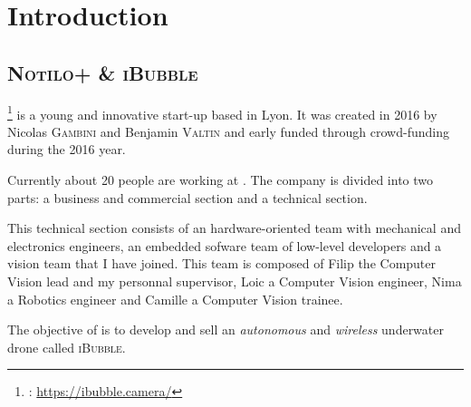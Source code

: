 
\chapter{Introduction} %

\label{Introduction} %


\newcommand{\keyword}[1]{\textbf{#1}}
\newcommand{\tabhead}[1]{\textbf{#1}}
\newcommand{\code}[1]{\texttt{\hl{#1}}}
\newcommand{\file}[1]{\texttt{\bfseries#1}}
\newcommand{\option}[1]{\texttt{\itshape#1}}
\newcommand{\iBubble}{\textcolor{mdtRed}{\textsc{iBubble}}}
\newcommand{\rasp}{\textcolor{mdtRed}{\textsc{Raspberry Pi}}}
\newcommand{\vc}{\textcolor{mdtRed}{\textsc{VideoCore IV 3D}}}
\newcommand{\cpu}{\textcolor{mdtRed}{\textsc{ARM CPU}}}
\newcommand{\bcm}{\textcolor{mdtRed}{\textsc{BCM2837}}}
\newcommand{\qpu}{\textcolor{mdtRed}{\textsc{QPU}}}


\section{\textsc{Notilo+} \& \textsc{iBubble}}

\footnote{\groupname{}: \url{https://ibubble.camera/}}\groupname{} is a young and innovative start-up based in Lyon. It was created in 2016 by Nicolas \textsc{Gambini} and Benjamin \textsc{Valtin} and early funded through crowd-funding during the 2016 year.

Currently about 20 people are working at \groupname{}. The company is divided into two parts: a business and commercial section and a technical section.

This technical section consists of an hardware-oriented team with mechanical and electronics engineers, an embedded sofware team of low-level developers and a vision team that I have joined. This team is composed of Filip the Computer Vision lead and my personnal supervisor, Loic a Computer Vision engineer, Nima a Robotics engineer and Camille a Computer Vision trainee.

The objective of \groupname{} is to develop and sell an \emph{autonomous} and \emph{wireless} underwater drone called \iBubble.

